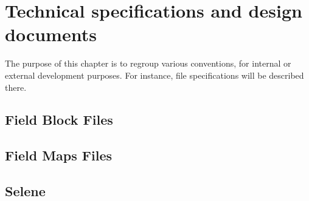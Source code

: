 \chapter{Technical specifications and design documents}

The purpose of this chapter is to regroup various conventions, for internal or external development purposes. For instance, file specifications will be described there.

\section{Field Block Files}

\section{Field Maps Files}

\section{Selene}

